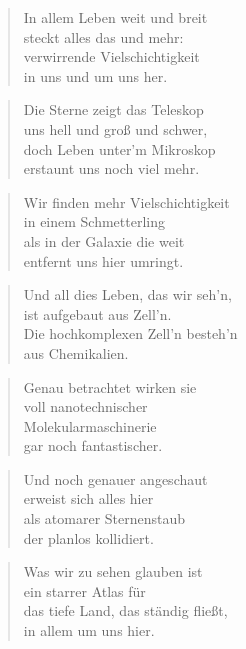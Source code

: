 \documentclass[10pt,a4paper]{article}
\begin{document}
\begin{paracol}{2}
\begin{verse}
In allem Leben weit und breit \\
steckt alles das und mehr: \\
verwirrende Vielschichtigkeit \\
in uns und um uns her. \\
\end{verse}

\begin{verse}
Die Sterne zeigt das Teleskop \\
uns hell und groß und schwer, \\
doch Leben unter’m Mikroskop \\
erstaunt uns noch viel mehr. \\
\end{verse}

\begin{verse}
Wir finden mehr Vielschichtigkeit \\
in einem Schmetterling \\
als in der Galaxie die weit \\
entfernt uns hier umringt. \\
\end{verse}

\begin{verse}
Und all dies Leben, das wir seh’n, \\
ist aufgebaut aus Zell’n. \\
Die hochkomplexen Zell’n besteh’n \\
aus Chemikalien. \\
\end{verse}

\begin{verse}
Genau betrachtet wirken sie \\
voll nanotechnischer \\
Molekularmaschinerie \\
gar noch fantastischer. \\
\end{verse}

\begin{verse}
Und noch genauer angeschaut \\
erweist sich alles hier \\
als atomarer Sternenstaub \\
der planlos kollidiert. \\
\end{verse}

\begin{verse}
Was wir zu sehen glauben ist \\
ein starrer Atlas für \\
das tiefe Land, das ständig fließt, \\
in allem um uns hier. \\
\end{verse}


\end{paracol}
\end{document}
